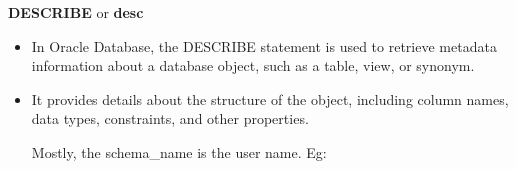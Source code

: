 
\begin{flushleft}
	
	\textbf{DESCRIBE} or \textbf{desc}
	\begin{itemize}
		
		\item In Oracle Database, the DESCRIBE statement is used to retrieve metadata information about a database object, such as a table, view, or synonym. 
		\item It provides details about the structure of the object, including column names, data types, constraints, and other properties.
		
		
		Mostly, the schema\_name is the user name.	
		Eg:
		
		
		

	\end{itemize}

\end{flushleft}

\newpage
